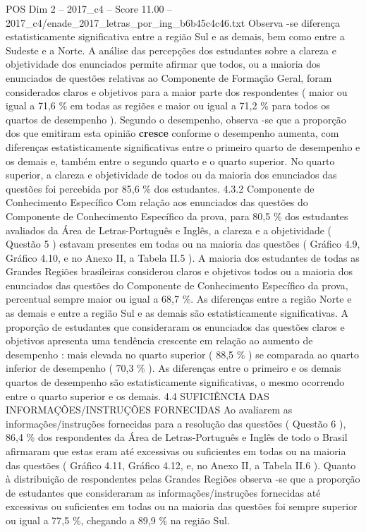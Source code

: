 \begin{textsample}{POS Dim 2 – 2017\_c4 – Score 11.00 – 2017\_c4/enade\_2017\_letras\_por\_ing\_b6b45c4c46.txt}
Observa -se diferença estatisticamente significativa entre a região Sul e as demais, bem como entre a Sudeste e a Norte.
A análise das percepções dos estudantes sobre a clareza e objetividade dos enunciados permite afirmar que todos, ou a maioria dos enunciados de questões relativas ao Componente de Formação Geral, foram considerados claros e objetivos para a maior parte dos respondentes ( maior ou igual a 71,6 \% em todas as regiões e maior ou igual a 71,2 \% para todos os quartos de desempenho ).
Segundo o desempenho, observa -se que a proporção dos que emitiram esta opinião \textbf{cresce} conforme o desempenho aumenta, com diferenças estatisticamente significativas entre o primeiro quarto de desempenho e os demais e, também entre o segundo quarto e o quarto superior.
No quarto superior, a clareza e objetividade de todos ou da maioria dos enunciados das questões foi percebida por 85,6 \% dos estudantes. 4.3.2 Componente de Conhecimento Específico Com relação aos enunciados das questões do Componente de Conhecimento Específico da prova, para 80,5 \% dos estudantes avaliados da Área de Letras-Português e Inglês, a clareza e a objetividade ( Questão 5 ) estavam presentes em todas ou na maioria das questões ( Gráfico 4.9, Gráfico 4.10, e no Anexo II, a Tabela II.5 ).
A maioria dos estudantes de todas as Grandes Regiões brasileiras considerou claros e objetivos todos ou a maioria dos enunciados das questões do Componente de Conhecimento Específico da prova, percentual sempre maior ou igual a 68,7 \%.
As diferenças entre a região Norte e as demais e entre a região Sul e as demais são estatisticamente significativas.
A proporção de estudantes que consideraram os enunciados das questões claros e objetivos apresenta uma tendência crescente em relação ao aumento de desempenho : mais elevada no quarto superior ( 88,5 \% ) se comparada ao quarto inferior de desempenho ( 70,3 \% ).
As diferenças entre o primeiro e os demais quartos de desempenho são estatisticamente significativas, o mesmo ocorrendo entre o quarto superior e os demais. 4.4 SUFICIÊNCIA DAS INFORMAÇÕES/INSTRUÇÕES FORNECIDAS Ao avaliarem as informações/instruções fornecidas para a resolução das questões ( Questão 6 ), 86,4 \% dos respondentes da Área de Letras-Português e Inglês de todo o Brasil afirmaram que estas eram até excessivas ou suficientes em todas ou na maioria das questões ( Gráfico 4.11, Gráfico 4.12, e, no Anexo II, a Tabela II.6 ).
Quanto à distribuição de respondentes pelas Grandes Regiões observa -se que a proporção de estudantes que consideraram as informações/instruções fornecidas até excessivas ou suficientes em todas ou na maioria das questões foi sempre superior ou igual a 77,5 \%, chegando a 89,9 \% na região Sul.

\end{textsample}
